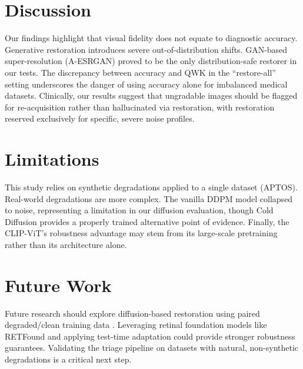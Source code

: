 \documentclass[runningheads]{llncs}
\begin{document}
\FloatBarrier

\section{Discussion}
Our findings highlight that visual fidelity does not equate to diagnostic accuracy. Generative restoration introduces severe out-of-distribution shifts. GAN-based super-resolution (A-ESRGAN) proved to be the only distribution-safe restorer in our tests. The discrepancy between accuracy and QWK in the ``restore-all'' setting underscores the danger of using accuracy alone for imbalanced medical datasets. Clinically, our results suggest that ungradable images should be flagged for re-acquisition rather than hallucinated via restoration, with restoration reserved exclusively for specific, severe noise profiles.

\section{Limitations}
This study relies on synthetic degradations applied to a single dataset (APTOS). Real-world degradations are more complex. The vanilla DDPM model collapsed to noise, representing a limitation in our diffusion evaluation, though Cold Diffusion provides a properly trained alternative point of evidence. Finally, the CLIP-ViT's robustness advantage may stem from its large-scale pretraining rather than its architecture alone.

\section{Future Work}
Future research should explore diffusion-based restoration using paired degraded/clean training data \cite{arxiv230809388}. Leveraging retinal foundation models like RETFound \cite{zhou2023retfound} and applying test-time adaptation \cite{wang2021tent} could provide stronger robustness guarantees. Validating the triage pipeline on datasets with natural, non-synthetic degradations is a critical next step.
\end{document}
